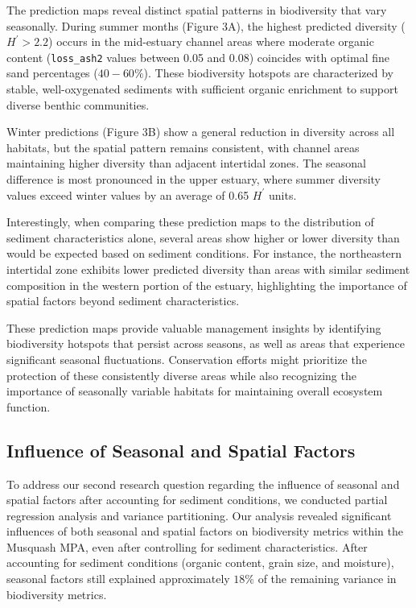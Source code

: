 \documentclass[12pt]{article}
\begin{document}
{\qquad The prediction maps reveal distinct spatial patterns in biodiversity that
vary seasonally. During summer months (Figure 3A), the highest predicted
diversity ($H^{\prime} > 2.2$) occurs in the mid-estuary channel areas where
moderate organic content (\texttt{loss\_ash2} values between 0.05 and 0.08)
coincides with optimal fine sand percentages ($40-60\%$). These biodiversity
hotspots are characterized by stable, well-oxygenated sediments with sufficient
organic enrichment to support diverse benthic communities.

\qquad Winter predictions (Figure 3B) show a general reduction in diversity
across all habitats, but the spatial pattern remains consistent, with channel
areas maintaining higher diversity than adjacent intertidal zones. The seasonal
difference is most pronounced in the upper estuary, where summer diversity
values exceed winter values by an average of 0.65 $H^{\prime}$ units.

\qquad Interestingly, when comparing these prediction maps to the distribution
of sediment characteristics alone, several areas show higher or lower diversity
than would be expected based on sediment conditions. For instance, the
northeastern intertidal zone exhibits lower predicted diversity than areas with
similar sediment composition in the western portion of the estuary, highlighting
the importance of spatial factors beyond sediment characteristics.

\qquad These prediction maps provide valuable management insights by identifying
biodiversity hotspots that persist across seasons, as well as areas that
experience significant seasonal fluctuations. Conservation efforts might
prioritize the protection of these consistently diverse areas while also
recognizing the importance of seasonally variable habitats for maintaining
overall ecosystem function.


\subsection{Influence of Seasonal and Spatial Factors}

\qquad To address our second research question regarding the influence of
seasonal and spatial factors after accounting for sediment conditions, we
conducted partial regression analysis and variance partitioning. Our analysis
revealed significant influences of both seasonal and spatial factors on
biodiversity metrics within the Musquash MPA, even after controlling for
sediment characteristics. After accounting for sediment conditions (organic
content, grain size, and moisture), seasonal factors still explained
approximately $18\%$ of the remaining variance in biodiversity metrics.

}
\end{document}
